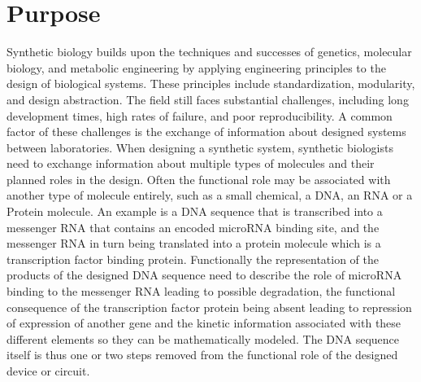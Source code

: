 \section{Purpose}


Synthetic biology builds upon the techniques and successes of genetics, molecular biology, and metabolic engineering by applying engineering principles to the design of biological systems. These principles include standardization, modularity, and design abstraction. The field still faces substantial challenges, including long development times, high rates of failure, and poor reproducibility. A common factor of these challenges is the exchange of information about designed systems between laboratories. When designing a synthetic system,  synthetic biologists need to exchange information about multiple types of molecules and their planned roles in the design. Often the functional role may be associated with another type of molecule entirely, such as a small chemical, a DNA, an RNA or a Protein molecule. An example is a DNA sequence that is transcribed into a messenger RNA that contains an encoded microRNA binding site, and the messenger RNA in turn being translated into a protein molecule which is a transcription factor binding protein. Functionally the representation of the products of the designed DNA sequence need to describe the role of microRNA binding to the messenger RNA leading to possible  degradation, the functional consequence of the transcription factor protein being absent leading to repression of expression of another gene and the kinetic information associated with these different elements so they can be mathematically modeled. The DNA sequence itself is thus one or two steps removed from the functional role of the designed device or circuit.


